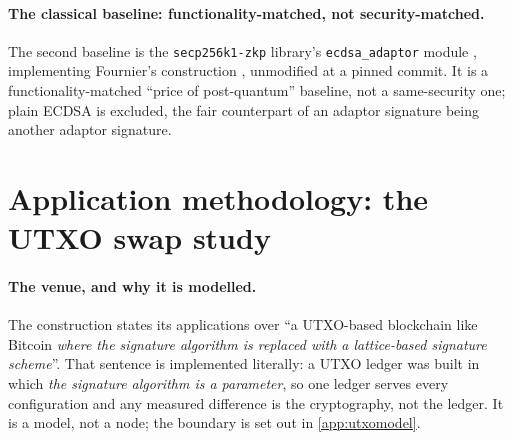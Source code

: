 \paragraph{The classical baseline: functionality-matched, not security-matched.}
The second baseline is the \texttt{secp256k1-zkp} library's \texttt{ecdsa\_adaptor}
module \cite{secp256k1zkp}, implementing Fournier's construction
\cite{fournier2019adaptor}, unmodified at a pinned commit. It is a functionality-matched
``price of post-quantum'' baseline, not a same-security one; plain ECDSA is excluded, the
fair counterpart of an adaptor signature being another adaptor signature.

\section{Application methodology: the UTXO swap study}
\label{sec:stage2method}

\paragraph{The venue, and why it is modelled.}
The construction \cite{esgin2020post} states its applications over ``a UTXO-based
blockchain like Bitcoin \emph{where the signature algorithm is replaced with a
lattice-based signature scheme}''. That sentence is implemented literally: a UTXO ledger
was built in which \emph{the signature algorithm is a parameter}, so one ledger serves
every configuration and any measured difference is the cryptography, not the ledger. It is
a model, not a node; the boundary is set out in \cref{app:utxomodel}.

